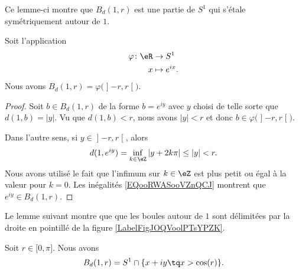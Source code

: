 Ce lemme-ci montre que \( B_d(1,r)\) est une partie de \( S^1\) qui s'étale symétriquement autour de \( 1\).
\begin{lemma}       \label{LEMooMYNVooIWWsiV}
	Soit l'application
	\begin{equation}
		\begin{aligned}
			\varphi\colon \eR & \to S^1          \\
			x                 & \mapsto  e^{ix}.
		\end{aligned}
	\end{equation}
	Nous avons \( B_d(1,r)=\varphi\big( \mathopen] -r , r \mathclose[ \big)\).
\end{lemma}

\begin{proof}
	Soit \( b\in B_d(1,r)\) de la forme \( b= e^{iy}\) avec \( y\) choisi de telle sorte que \( d(1,b)=| y |\). Vu que \( d(1,b)<r\), nous avons \( | y |<r\) et donc \( b\in \varphi\big( \mathopen] -r , r \mathclose[ \big)\).

	Dans l'autre sens, si \( y\in\mathopen] -r , r \mathclose[\), alors
	\begin{equation}        \label{EQooRWASooVZnQCJ}
		d(1, e^{iy})=\inf_{k\in \eZ}| y+2k\pi |\leq | y |<r.
	\end{equation}
	Nous avons utilisé le fait que l'infimum sur \( k\in \eZ\) est plus petit ou égal à la valeur pour \( k=0\). Les inégalités \eqref{EQooRWASooVZnQCJ} montrent que \(  e^{iy}\in B_d(1,r)\).
\end{proof}

Le lemme suivant montre que que les boules autour de \( 1\) sont délimitées par la droite en pointillé de la figure \ref{LabelFigJOQVoolPTsYPZK}.
\begin{lemma}       \label{LEMooLINCooHJmJWx}
	Soit \( r\in \mathopen[ 0 , \pi \mathclose]\). Nous avons
	\begin{equation}
		B_d(1,r)=S^1\cap\{x+iy\tq x>\cos(r)\}.
	\end{equation}
\end{lemma}

